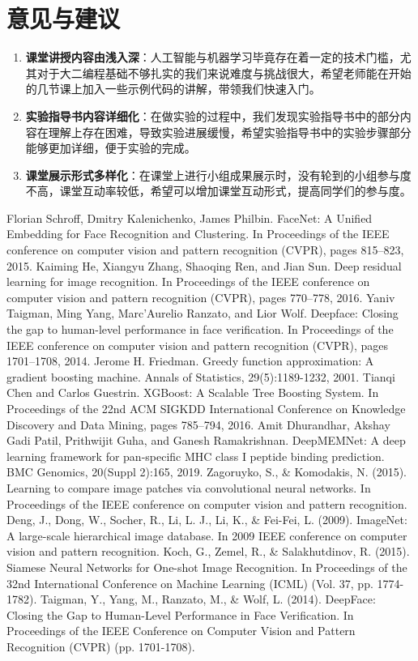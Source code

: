 \documentclass[UTF8]{ctexart}
\begin{document}
\section{意见与建议}
\begin{enumerate}
  \item \textbf{课堂讲授内容由浅入深}：人工智能与机器学习毕竟存在着一定的技术门槛，尤其对于大二编程基础不够扎实的我们来说难度与挑战很大，希望老师能在开始的几节课上加入一些示例代码的讲解，带领我们快速入门。
  \item \textbf{实验指导书内容详细化}：在做实验的过程中，我们发现实验指导书中的部分内容在理解上存在困难，导致实验进展缓慢，希望实验指导书中的实验步骤部分能够更加详细，便于实验的完成。
  \item \textbf{课堂展示形式多样化}：在课堂上进行小组成果展示时，没有轮到的小组参与度不高，课堂互动率较低，希望可以增加课堂互动形式，提高同学们的参与度。
\end{enumerate}


\newpage

\begin{thebibliography}{99}
   Florian Schroff, Dmitry Kalenichenko, James Philbin. FaceNet: A Unified Embedding for Face Recognition and Clustering. In Proceedings of the IEEE conference on computer vision and pattern recognition (CVPR), pages 815–823, 2015.
   Kaiming He, Xiangyu Zhang, Shaoqing Ren, and Jian Sun. Deep residual learning for image recognition. In Proceedings of the IEEE conference on computer vision and pattern recognition (CVPR), pages 770–778, 2016.
   Yaniv Taigman, Ming Yang, Marc'Aurelio Ranzato, and Lior Wolf. Deepface: Closing the gap to human-level performance in face verification. In Proceedings of the IEEE conference on computer vision and pattern recognition (CVPR), pages 1701–1708, 2014.
   Jerome H. Friedman. Greedy function approximation: A gradient boosting machine. Annals of Statistics, 29(5):1189-1232, 2001.
   Tianqi Chen and Carlos Guestrin. XGBoost: A Scalable Tree Boosting System. In Proceedings of the 22nd ACM SIGKDD International Conference on Knowledge Discovery and Data Mining, pages 785–794, 2016.
   Amit Dhurandhar, Akshay Gadi Patil, Prithwijit Guha, and Ganesh Ramakrishnan. DeepMEMNet: A deep learning framework for pan-specific MHC class I peptide binding prediction. BMC Genomics, 20(Suppl 2):165, 2019.
   Zagoruyko, S., \& Komodakis, N. (2015). Learning to compare image patches via convolutional neural networks. In Proceedings of the IEEE conference on computer vision and pattern recognition.
   Deng, J., Dong, W., Socher, R., Li, L. J., Li, K., \& Fei-Fei, L. (2009). ImageNet: A large-scale hierarchical image database. In 2009 IEEE conference on computer vision and pattern recognition.
   Koch, G., Zemel, R., \& Salakhutdinov, R. (2015). Siamese Neural Networks for One-shot Image Recognition. In Proceedings of the 32nd International Conference on Machine Learning (ICML) (Vol. 37, pp. 1774-1782).
   Taigman, Y., Yang, M., Ranzato, M., \& Wolf, L. (2014). DeepFace: Closing the Gap to Human-Level Performance in Face Verification. In Proceedings of the IEEE Conference on Computer Vision and Pattern Recognition (CVPR) (pp. 1701-1708).
\end{thebibliography}
\end{document}
